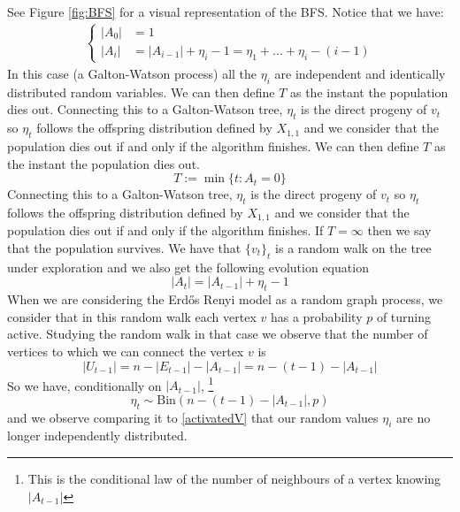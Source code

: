 See Figure \ref{fig:BFS} for a visual representation of the BFS.
Notice that we have:
\begin{align}\label{activatedV}
	\left\{\begin{array}{rl}
			|A_0| &= 1\\
			|A_i| &= |A_{i-1}| + \eta_i - 1 = \eta_1 + ... + \eta_i - ( i - 1)
	 \end{array}
	\right.
\end{align}
In this case (a Galton-Watson process) all the $\eta_i$ are independent and identically distributed random variables.
We can then define $T$ as the instant the population dies out.
Connecting this to a Galton-Watson tree, $\eta_t$ is the direct progeny of $v_t$ so $\eta_t$ follows the offspring distribution defined by $X_{1, 1}$ and we consider that the population dies out if and only if the algorithm finishes.
We can then define $T$ as the instant the population dies out.
\begin{equation}\label{eq:defT}
	T := \min\{t: A_t = 0\}
\end{equation}
Connecting this to a Galton-Watson tree, $\eta_t$ is the direct progeny of $v_t$ so $\eta_t$ follows the offspring distribution defined by $X_{1, 1}$ and we consider that the population dies out if and only if the algorithm finishes.
If $T = \infty$ then we say that the population survives. 
\newline
We have that $\{v_t\}_t$ is a random walk on the tree under exploration and we also get the following evolution equation 
\begin{equation}\label{eq:St}
	|A_t| = |A_{t-1}| + \eta_t - 1
\end{equation}
\newline
When we are considering the Erd\H{o}s Renyi model as a random graph process, we consider that in this random walk each vertex $v$ has a probability $p$ of turning active. 
Studying the random walk in that case we observe that the number of vertices to which we can connect the vertex $v$ is
\begin{equation}
	|U_{t-1}| = n - |E_{t-1}| - |A_{t-1}| = n - (t-1) - |A_{t-1}|
\end{equation}
So we have, conditionally on $|A_{t-1}|$,
\footnote{This is the conditional law of the number of neighbours of a vertex knowing $|A_{t-1}|$}
\begin{equation}
	\eta_t \sim \text{Bin}( n - (t-1) - |A_{t-1}|, p)
\end{equation}
and we observe comparing it to \eqref{activatedV} that our random values $\eta_i$ are no longer independently distributed. 
